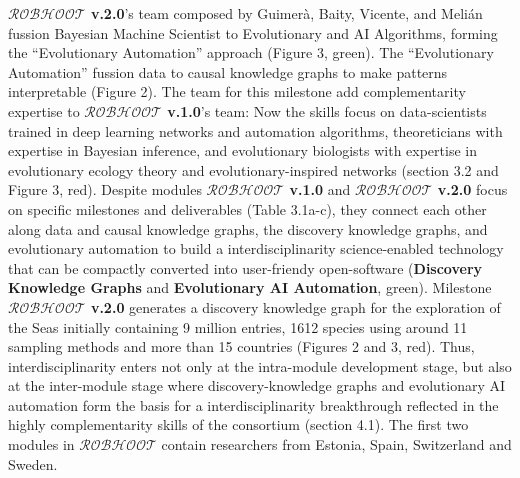 \documentclass[11pt, a4paper]{article} %
\begin{document}
  {\bf $\mathcal{ROBHOOT}$ v.2.0}'s team composed by Guimer\`a, Baity,
  Vicente, and Meli\'an fussion Bayesian Machine Scientist to
  Evolutionary and AI Algorithms, forming the ``Evolutionary
  Automation'' approach (Figure 3, green). The ``Evolutionary
  Automation'' fussion data to causal knowledge graphs to make
  patterns interpretable (Figure 2). The team for this milestone add
  complementarity expertise to {\bf $\mathcal{ROBHOOT}$ v.1.0}'s team:
  Now the skills focus on data-scientists trained in deep learning
  networks and automation algorithms, theoreticians with expertise in
  Bayesian inference, and evolutionary biologists with expertise in
  evolutionary ecology theory and evolutionary-inspired networks
  (section 3.2 and Figure 3, red). Despite modules {\bf
    $\mathcal{ROBHOOT}$ v.1.0} and {\bf $\mathcal{ROBHOOT}$ v.2.0}
  focus on specific milestones and deliverables (Table 3.1a-c), they
  connect each other along data and causal knowledge graphs, the
  discovery knowledge graphs, and evolutionary automation to build a
  interdisciplinarity science-enabled technology that can be compactly
  converted into user-friendy open-software ({\bf Discovery Knowledge
    Graphs} and {\bf Evolutionary AI Automation}, green). Milestone
  {\bf $\mathcal{ROBHOOT}$ v.2.0} generates a discovery knowledge
  graph for the exploration of the Seas initially containing 9 million
  entries, 1612 species using around 11 sampling methods and more than
  15 countries (Figures 2 and 3, red). Thus, interdisciplinarity
  enters not only at the intra-module development stage, but also at
  the inter-module stage where discovery-knowledge graphs and
  evolutionary AI automation form the basis for a interdisciplinarity
  breakthrough reflected in the highly complementarity skills of the
  consortium (section 4.1). The first two modules in {\bf
    $\mathcal{ROBHOOT}$} contain researchers from Estonia, Spain,
  Switzerland and Sweden.
  
\end{document}
